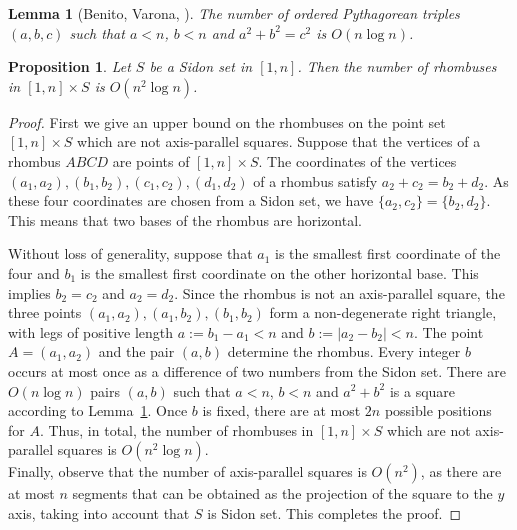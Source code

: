 \documentclass[11pt]{article}
\theoremstyle{plain}
\newtheorem{lemma}[theorem]{\bf Lemma}
\newtheorem{prop}[theorem]{\bf Proposition}
\begin{document}
	\begin{lemma}[Benito, Varona, \cite{pythagorean}]\label{pitlemma}
		The number of ordered Pythagorean triples $(a,b,c)$ such that $a<n$, $b<n$ and $a^2+b^2=c^2$
		is $O(n\log n)$.
	\end{lemma}
	
	\begin{prop}\label{rhombnm} Let $S$ be a Sidon set in $[1,n]$. Then the number of   rhombuses in $[1,n]\times S$ is $O(n^2\log n)$.
	\end{prop}
	
	\begin{proof} First we give an upper bound on the rhombuses on the point set $[1,n]\times S$ which are not axis-parallel squares.  Suppose that the vertices of a rhombus $ABCD$ are points of $[1,n]\times S$. 
		The coordinates of the vertices $(a_1,a_2),(b_1,b_2),(c_1,c_2),(d_1,d_2)$ of a rhombus  satisfy $a_2+c_2=b_2+d_2$. As these four coordinates are chosen from a Sidon set, we have $\{a_2,c_2\}= \{b_2,d_2\}$. This means that two bases of the rhombus are horizontal. 
		
		Without loss of generality, suppose that $a_1$ is the smallest first coordinate of the four and $b_1$ is the smallest first coordinate on the other horizontal base. This implies $b_2=c_2$ and $a_2=d_2$. Since the rhombus is not an axis-parallel square, the three points $(a_1,a_2),(a_1,b_2),(b_1,b_2)$ form a non-degenerate right triangle, with legs of positive length $a:=b_1-a_1<n$ and $b:=|a_2-b_2|<n$. %
		The point $A=(a_1,a_2)$ and the pair $(a,b)$ determine the rhombus. Every integer $b$ occurs at most once as a difference of two numbers from the Sidon set. %
		There are $O(n\log n)$ pairs $(a,b)$ such that $a<n$, $b<n$ and $a^2+b^2$ is a square according to  Lemma~\ref{pitlemma}.
		Once $b$ is fixed, there are at most $2n$ possible  positions for $A$.
		Thus, in total, the number of rhombuses in $[1,n]\times S$ which are not axis-parallel squares is $O(n^2\log n)$. \\
		Finally, observe that the number of axis-parallel squares is $O(n^2)$, as there are at most $n$ segments that can be obtained as the projection of the square to the $y$ axis, taking into account that $S$ is  Sidon set. This completes the proof.
	\end{proof}
	
\end{document}
